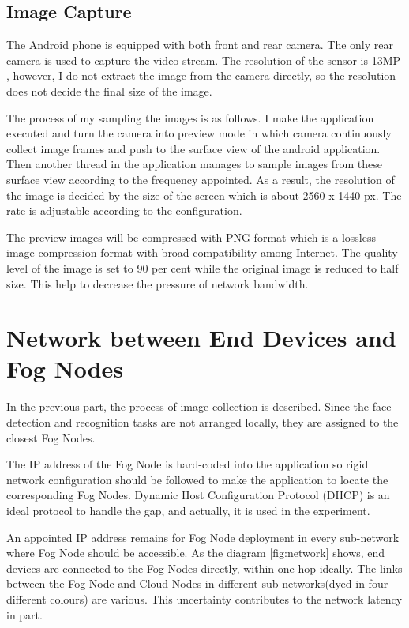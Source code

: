 \subsection{Image Capture}
The Android phone is equipped with both front and rear camera. The only rear camera is used to capture the video stream. The resolution of the sensor is 13MP \cite{wiki:megapixel}, however, I do not extract the image from the camera directly, so the resolution does not decide the final size of the image.

The process of my sampling the images is as follows. I make the application executed and turn the camera into preview mode in which camera continuously collect image frames and push to the surface view of the android application. Then another thread in the application manages to sample images from these surface view according to the frequency appointed. As a result, the resolution of the image is decided by the size of the screen which is about 2560 x 1440 px. The rate is adjustable according to the configuration.

The preview images will be compressed with PNG format  \cite{roelofs1999png} which is a lossless image compression format with broad compatibility among Internet. The quality level of the image is set to 90 per cent while the original image is reduced to half size. This help to decrease the pressure of network bandwidth.

\section{Network between End Devices and Fog Nodes}
In the previous part, the process of image collection is described. Since the face detection and recognition tasks are not arranged locally, they are assigned to the closest Fog Nodes.

The IP address of the Fog Node is hard-coded into the application so rigid network configuration should be followed to make the application to locate the corresponding Fog Nodes. Dynamic Host Configuration Protocol (DHCP) \cite{droms2002dhcp} is an ideal protocol to handle the gap, and actually, it is used in the experiment.

An appointed IP address remains for Fog Node deployment in every sub-network where Fog Node should be accessible. As the diagram \ref{fig:network} shows, end devices are connected to the Fog Nodes directly, within one hop ideally. The links between the Fog Node and Cloud Nodes in different sub-networks(dyed in four different colours) are various. This uncertainty contributes to the network latency in part.

